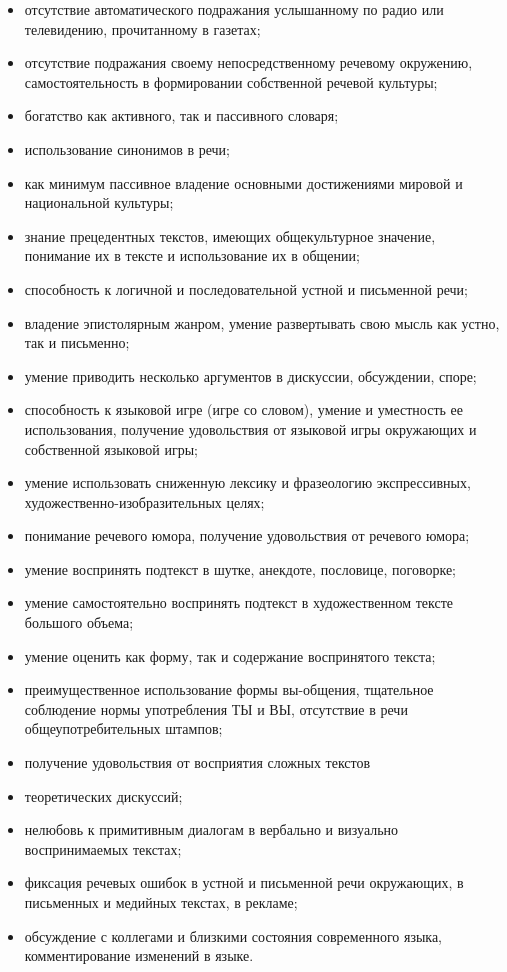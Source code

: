 \begin{itemize}
    \item отсутствие автоматического подражания услышанному по радио или телевидению, прочитанному в газетах;
    \item отсутствие подражания своему непосредственному речевому окружению, самостоятельность в формировании собственной речевой культуры;
    \item богатство как активного, так и пассивного словаря;
    \item использование синонимов в речи;
    \item как минимум пассивное владение основными достижениями мировой и национальной культуры;
    \item знание прецедентных текстов, имеющих общекультурное значение, понимание их в тексте и использование их в общении;
    \item способность к логичной и последовательной устной и письменной речи;
    \item владение эпистолярным жанром, умение развертывать свою мысль как устно, так и письменно;
    \item умение приводить несколько аргументов в дискуссии, обсуждении, споре;
    \item способность к языковой игре (игре со словом), умение и уместность ее использования, получение удовольствия от языковой игры окружающих и собственной языковой игры;
    \item умение использовать сниженную лексику и фразеологию экспрессивных, художественно-изобразительных целях;
    \item понимание речевого юмора, получение удовольствия от речевого юмора;
    \item умение воспринять подтекст в шутке, анекдоте, пословице, поговорке;
    \item умение самостоятельно воспринять подтекст в художественном тексте большого объема;
    \item умение оценить как форму, так и содержание воспринятого текста;
    \item преимущественное использование формы вы-общения, тщательное соблюдение нормы употребления ТЫ и ВЫ, отсутствие в речи общеупотребительных штампов;
    \item получение удовольствия от восприятия сложных текстов
    \item теоретических дискуссий;
    \item нелюбовь к примитивным диалогам в вербально и визуально воспринимаемых текстах;
    \item фиксация речевых ошибок в устной и письменной речи окружающих, в письменных и медийных текстах, в рекламе;
    \item обсуждение с коллегами и близкими состояния современного языка, комментирование изменений в языке.
\end{itemize}
